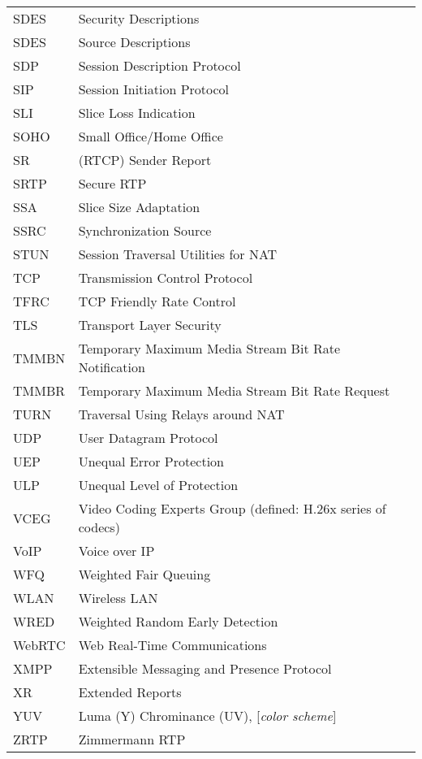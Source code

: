 \begin{longtable}{ll}
SDES 	& Security Descriptions \\
SDES	& Source Descriptions \\
SDP 	& Session Description Protocol \\
SIP 	& Session Initiation Protocol \\
SLI 	& Slice Loss Indication \\
SOHO 	& Small Office/Home Office \\
SR  	& (RTCP) Sender Report \\
SRTP 	& Secure RTP \\
SSA 	& Slice Size Adaptation \\
SSRC 	& Synchronization Source \\
STUN 	& Session Traversal Utilities for NAT \\
TCP 	& Transmission Control Protocol \\
TFRC 	& TCP Friendly Rate Control \\
TLS 	& Transport Layer Security \\
TMMBN 	& Temporary Maximum Media Stream Bit Rate Notification \\
TMMBR 	& Temporary Maximum Media Stream Bit Rate Request \\
TURN 	& Traversal Using Relays around NAT \\
UDP 	& User Datagram Protocol \\
UEP 	& Unequal Error Protection \\
ULP 	& Unequal Level of Protection \\
VCEG 	& Video Coding Experts Group (defined: H.26x series of codecs)\\
VoIP 	& Voice over IP \\
WFQ 	& Weighted Fair Queuing \\
WLAN	& Wireless LAN \\
WRED 	& Weighted Random Early Detection \\
WebRTC	& Web Real-Time Communications \\
XMPP 	& Extensible Messaging and Presence Protocol \\
XR  	& Extended Reports \\
YUV 	& Luma (Y) Chrominance (UV), [\textit{color scheme}] \\
ZRTP 	& Zimmermann RTP \\
\end{longtable}
